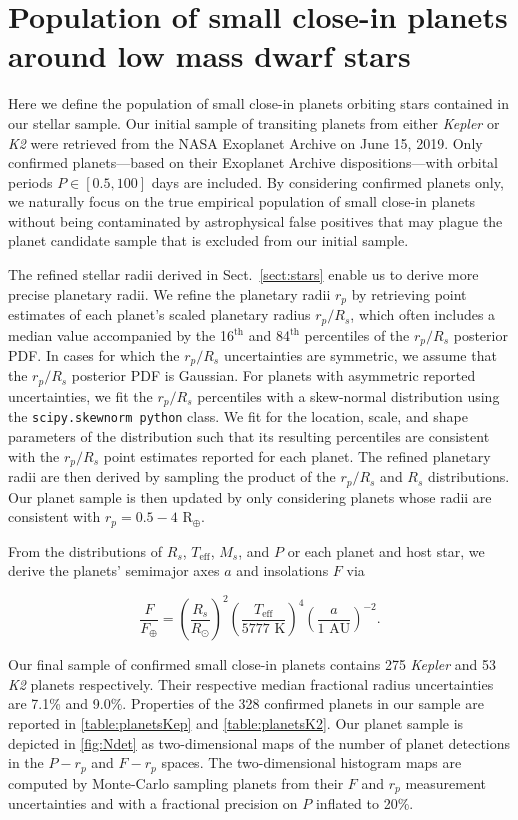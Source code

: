 \documentclass[twocolumn]{emulateapj}
\newcommand{\kepler}[1]{\emph{Kepler}#1}
\newcommand{\ktwo}[1]{\emph{K2}#1}
\newcommand{\teff}[1]{$T_{\text{eff}}$#1}
\begin{document}
\section{Population of small close-in planets around low mass dwarf stars} \label{sect:planets}
Here we define the population of small close-in planets orbiting stars contained in our stellar sample.
Our initial sample of transiting planets from either \kepler{} or \ktwo{} were retrieved from the
NASA Exoplanet Archive \citep{akeson13} on June 15, 2019. Only confirmed
planets---based on their Exoplanet Archive dispositions---with orbital periods
$P\in [0.5,100]$ days are included. By considering confirmed
planets only, we naturally focus on the true empirical population of small close-in planets
without being contaminated by astrophysical false positives that may plague the planet
candidate sample that is excluded from our initial sample.

The refined stellar radii derived in Sect.~\ref{sect:stars} enable us to derive more precise
planetary radii.
We refine the planetary radii $r_p$ by retrieving point estimates of each planet's scaled planetary radius
$r_p/R_s$, which often includes a median value 
accompanied by the 16$^{\text{th}}$ and 84$^{\text{th}}$ percentiles of the $r_p/R_s$ posterior PDF.
In cases for which the $r_p/R_s$ uncertainties
are symmetric, we assume that the $r_p/R_s$ posterior PDF is Gaussian. For planets with asymmetric reported
uncertainties, we fit the $r_p/R_s$ percentiles with a skew-normal distribution using the
\texttt{scipy.skewnorm python} class. We fit for the location, scale, and shape parameters of the
distribution such that its resulting percentiles are consistent with
the $r_p/R_s$ point estimates reported for each planet. The refined planetary radii are then derived by
sampling the product of the $r_p/R_s$ and $R_s$ distributions. Our planet sample is then updated by
only considering planets whose radii are consistent with $r_p = 0.5-4$ R$_{\oplus}$.

From the distributions of $R_s$, \teff{,} $M_s$, and $P$ or each planet and host star, we derive the planets'
semimajor axes $a$ and insolations $F$ via

\begin{equation}
  \frac{F}{F_{\oplus}} = \left( \frac{R_s}{R_{\odot}} \right)^2  \left( \frac{T_{\text{eff}}}{5777 \text{ K}} \right)^4 \left( \frac{a}{1 \text{ AU}} \right)^{-2}.
\end{equation}

Our final sample of confirmed small close-in planets 
contains 275 \kepler{} and 53 \ktwo{} planets respectively. Their respective median fractional
radius uncertainties are 7.1\% and 9.0\%. Properties of the 328 confirmed planets in our sample
are reported in \autoref{table:planetsKep} and \autoref{table:planetsK2}. Our planet sample is
depicted in \autoref{fig:Ndet} as two-dimensional maps of the number of planet detections in
the $P-r_p$ and $F-r_p$ spaces. The two-dimensional histogram maps are computed by
Monte-Carlo sampling planets from their $F$ and $r_p$
measurement uncertainties and with a fractional precision on $P$ inflated to 20\%.
\end{document}
